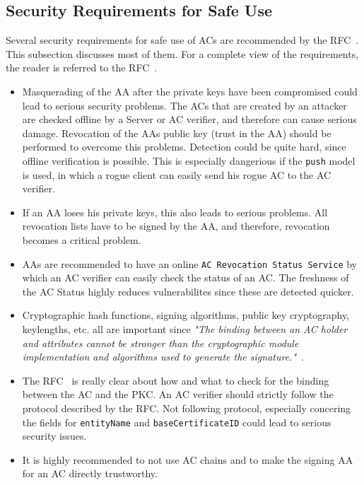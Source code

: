 \documentclass[10pt,conference,a4paper]{IEEEtran}
\begin{document}
\subsection{Security Requirements for Safe Use}
Several security requirements for safe use of ACs are recommended by the RFC~\cite{rfc_ac}. This subsection discusses most of them. For a complete view of the requirements, the reader is referred to the RFC~\cite{rfc_ac}.

\begin{itemize}
	\item Masquerading of the AA after the private keys have been compromised could lead to serious security problems. The ACs that are created by an attacker are checked offline by a Server or AC verifier, and therefore can cause serious damage. Revocation of the AAs public key (trust in the AA) should be performed to overcome this problems. Detection could be quite hard, since offline verification is possible. This is especially dangerious if the \texttt{push} model is used, in which a rogue client can easily send his rogue AC to the AC verifier.

	\item If an AA loses his private keys, this also leads to serious problems. All revocation lists have to be signed by the AA, and therefore, revocation becomes a critical problem.

	\item AAs are recommended to have an online \texttt{AC Revocation Status Service} by which an AC verifier can easily check the status of an AC. The freshness of the AC Status highly reduces vulnerabilites since these are detected quicker.

	\item Cryptographic hash functions, signing algorithms, public key cryptography, keylengths, etc. all are important since \textit{"The binding between an AC holder and attributes cannot be stronger than the cryptographic module implementation and algorithms used to generate the signature."}~\cite{rfc_ac}.

	\item The RFC~\cite{rfc_ac} is really clear about how and what to check for the binding between the AC and the PKC. An AC verifier should strictly follow the protocol described by the RFC. Not following protocol, especially concering the fields for \texttt{entityName} and \texttt{baseCertificateID} could lead to serious security issues.

	\item It is highly recommended to not use AC chains and to make the signing AA for an AC directly trustworthy.
\end{itemize}
\end{document}
